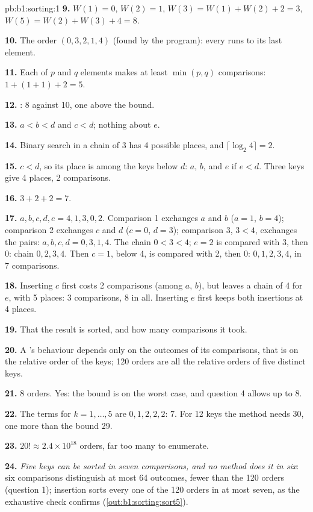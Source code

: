 \begin{solution}{pb:b1:sorting:1}
\textbf{9.} $W(1) = 0$, $W(2) = 1$, $W(3) = W(1) + W(2) + 2 = 3$, $W(5) = W(2) + W(3) + 4 = 8$.

\textbf{10.} The order $(0, 3, 2, 1, 4)$ (found by the program): every  runs to its last element.

\textbf{11.} Each  of $p$ and $q$ elements makes at least $\min(p, q)$ comparisons: $1 + (1 + 1) + 2 = 5$.

\textbf{12.} : 8 against 10, one above the bound.

\textbf{13.} $a < b < d$ and $c < d$; nothing about $e$.

\textbf{14.} Binary search in a chain of 3 has 4 possible places, and $\lceil \log_2 4 \rceil = 2$.

\textbf{15.} $c < d$, so its place is among the keys below $d$: $a$, $b$, and $e$ if $e < d$. Three keys give 4 places,
2 comparisons.

\textbf{16.} $3 + 2 + 2 = 7$.

\textbf{17.} $a, b, c, d, e = 4, 1, 3, 0, 2$. Comparison 1 exchanges $a$ and $b$ ($a = 1$, $b = 4$); comparison 2
exchanges $c$ and $d$ ($c = 0$, $d = 3$); comparison 3, $3 < 4$, exchanges the pairs: $a, b, c, d = 0, 3, 1, 4$. The
chain $0 < 3 < 4$; $e = 2$ is compared with 3, then 0: chain $0, 2, 3, 4$. Then $c = 1$, below 4, is compared with 2,
then 0: $0, 1, 2, 3, 4$, in 7 comparisons.

\textbf{18.} Inserting $c$ first costs 2 comparisons (among $a$, $b$), but leaves a chain of 4 for $e$, with 5 places:
3 comparisons, 8 in all. Inserting $e$ first keeps both insertions at 4 places.

\textbf{19.} That the result is sorted, and how many comparisons it took.

\textbf{20.} A 's behaviour depends only on the outcomes of its comparisons, that is on the relative order
of the keys; 120 orders are all the relative orders of five distinct keys.

\textbf{21.} 8 orders. Yes: the bound is on the worst case, and question 4 allows up to 8.

\textbf{22.} The terms for $k = 1, \dots, 5$ are $0, 1, 2, 2, 2$: 7. For 12 keys the method needs 30, one more than the
bound 29.

\textbf{23.} $20! \approx 2.4 \times 10^{18}$ orders, far too many to enumerate.

\textbf{24.} \emph{Five keys can be sorted in seven comparisons, and no method does it in six}: six comparisons
distinguish at most 64 outcomes, fewer than the 120 orders (question 1);  insertion sorts every one of the 120
orders in at most seven, as the exhaustive check confirms (\cref{out:b1:sorting:sort5}).
\end{solution}
